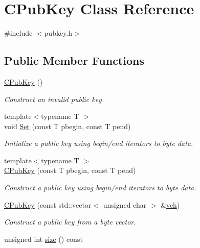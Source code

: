 \hypertarget{class_c_pub_key}{}\section{C\+Pub\+Key Class Reference}
\label{class_c_pub_key}


{\ttfamily \#include $<$pubkey.\+h$>$}

\subsection*{Public Member Functions}
\begin{DoxyCompactItemize}
\item 
\mbox{\hyperlink{class_c_pub_key_a468f3aef3555d12ede19c0d8dc88c13a}{C\+Pub\+Key}} ()
\begin{DoxyCompactList}\small\item\em Construct an invalid public key. \end{DoxyCompactList}\item 
{\footnotesize template$<$typename T $>$ }\\void \mbox{\hyperlink{class_c_pub_key_af59bc1d3be119c1f8b49d3c1e2c0797b}{Set}} (const T pbegin, const T pend)
\begin{DoxyCompactList}\small\item\em Initialize a public key using begin/end iterators to byte data. \end{DoxyCompactList}\item 
{\footnotesize template$<$typename T $>$ }\\\mbox{\hyperlink{class_c_pub_key_a8c7527b40c96bfb8f48b669764301df8}{C\+Pub\+Key}} (const T pbegin, const T pend)
\begin{DoxyCompactList}\small\item\em Construct a public key using begin/end iterators to byte data. \end{DoxyCompactList}\item 
\mbox{\hyperlink{class_c_pub_key_a31307d0318ebda95c7e34ef1554fe2d2}{C\+Pub\+Key}} (const std\+::vector$<$ unsigned char $>$ \&\mbox{\hyperlink{class_c_pub_key_a9a55b20ad79b45f3430b4e316a2c48d4}{vch}})
\begin{DoxyCompactList}\small\item\em Construct a public key from a byte vector. \end{DoxyCompactList}\item 
unsigned int \mbox{\hyperlink{class_c_pub_key_a6bb28fcf0a5f799c69f5b7269363b309}{size}} () const

\end{DoxyCompactItemize}
